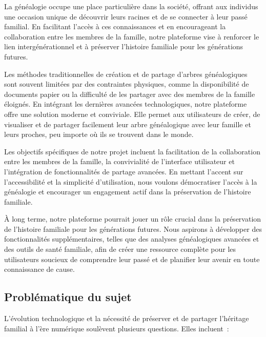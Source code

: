 La généalogie occupe une place particulière dans la société, offrant aux individus
une occasion unique de découvrir leurs racines et de se connecter à leur passé
familial. En facilitant l’accès à ces connaissances et en encourageant la
collaboration entre les membres de la famille, notre plateforme vise à renforcer
le lien intergénérationnel et à préserver l’histoire familiale pour les générations futures.

Les méthodes traditionnelles de création et de partage d’arbres généalogiques
sont souvent limitées par des contraintes physiques, comme la disponibilité de
documents papier ou la difficulté de les partager avec des membres de la famille
éloignés. En intégrant les dernières avancées technologiques, notre plateforme
offre une solution moderne et conviviale. Elle permet aux utilisateurs de créer,
de visualiser et de partager facilement leur arbre généalogique avec leur famille
et leurs proches, peu importe où ils se trouvent dans le monde.

Les objectifs spécifiques de notre projet incluent la facilitation de la collaboration
entre les membres de la famille, la convivialité de l’interface utilisateur et
l’intégration de fonctionnalités de partage avancées. En mettant l’accent sur
l’accessibilité et la simplicité d’utilisation, nous voulons démocratiser l’accès
à la généalogie et encourager un engagement actif dans la préservation de l’histoire familiale.

À long terme, notre plateforme pourrait jouer un rôle crucial dans la préservation
de l'histoire familiale pour les générations futures. Nous aspirons à développer
des fonctionnalités supplémentaires, telles que des analyses généalogiques avancées
et des outils de santé familiale, afin de créer une ressource complète pour les
utilisateurs soucieux de comprendre leur passé et de planifier leur avenir en
toute connaissance de cause.

\subsection{Problématique du sujet}
L’évolution technologique et la nécessité de préserver et de partager l’héritage
familial à l’ère numérique soulèvent plusieurs questions. Elles incluent :

